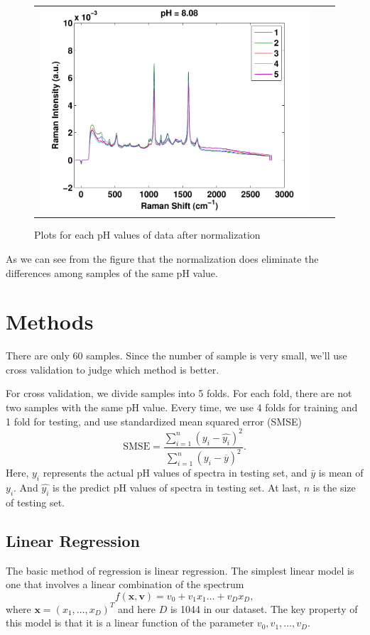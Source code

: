\documentclass[a4paper]{article}
\newcommand{\bfv}{\mathbf{v}}
\newcommand{\bfx}{\mathbf{x}}
\begin{document}
\begin{figure}[h]
\begin{tabular}{ccc}
\includegraphics[width=.33\textwidth]{images/n12.pdf} \\
\end{tabular}
\caption{Plots for each pH values of data after normalization}\label{pic3}
\end{figure}

As we can see from the figure that the normalization does eliminate the differences among samples of the same pH value.
\section{Methods}
There are only 60 samples. Since the number of sample is very small, we'll use cross validation to judge which method is better.

For cross validation, we divide samples into 5 folds. For each fold, there are not two samples with the same pH value. Every time, we use 4 folds for training and 1 fold for testing, and use standardized mean squared error (SMSE)%
\begin{equation}
\mathrm{SMSE}=\frac{\displaystyle \sum_{i=1}^n (y_i-\hat{y_i})^2}{\displaystyle \sum_{i=1}^n (y_i-\overline{y})^2}.
\end{equation}
Here, $y_i$ represents the actual pH values of spectra in testing set, and $\bar{y}$ is mean of $y_i$. And $\hat{y_i}$ is the predict pH values of spectra in testing set. At last, $n$ is the size of testing set.
\subsection{Linear Regression}
The basic method of regression is linear regression. The simplest linear model is one that involves a linear combination of the spectrum
\begin{equation}
f(\bfx,\bfv)=v_0+v_1x_1\ldots+v_Dx_D,
\end{equation}
where $\bfx=(x_1,\ldots,x_D)^T$ and here $D$ is 1044 in our dataset. The key property of this model is that it is a linear function of the parameter $v_0,v_1,\ldots,v_D$. 
\end{document}

